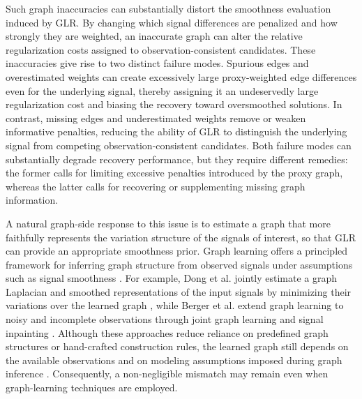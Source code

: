 Such graph inaccuracies can substantially distort the smoothness evaluation induced by GLR.
By changing which signal differences are penalized and how strongly they are weighted, an inaccurate graph can alter the relative regularization costs assigned to observation-consistent candidates.
These inaccuracies give rise to two distinct failure modes.
Spurious edges and overestimated weights can create excessively large proxy-weighted edge differences even for the underlying signal, thereby assigning it an undeservedly large regularization cost and biasing the recovery toward oversmoothed solutions.
In contrast, missing edges and underestimated weights remove or weaken informative penalties, reducing the ability of GLR to distinguish the underlying signal from competing observation-consistent candidates.
Both failure modes can substantially degrade recovery performance, but they require different remedies: the former calls for limiting excessive penalties introduced by the proxy graph, whereas the latter calls for recovering or supplementing missing graph information.

A natural graph-side response to this issue is to estimate a graph that more faithfully represents the variation structure of the signals of interest, so that GLR can provide an appropriate smoothness prior.
Graph learning offers a principled framework for inferring graph structure from observed signals under assumptions such as signal smoothness \cite{kalofolias2016how,dong2016learning,dong2019learninggraphs}.
For example, Dong et al. jointly estimate a graph Laplacian and smoothed representations of the input signals by minimizing their variations over the learned graph \cite{dong2016learning}, while Berger et al. extend graph learning to noisy and incomplete observations through joint graph learning and signal inpainting \cite{berger2020efficient}.
Although these approaches reduce reliance on predefined graph structures or hand-crafted construction rules, the learned graph still depends on the available observations and on modeling assumptions imposed during graph inference \cite{dong2019learninggraphs,berger2020efficient}.
Consequently, a non-negligible mismatch may remain even when graph-learning techniques are employed.

